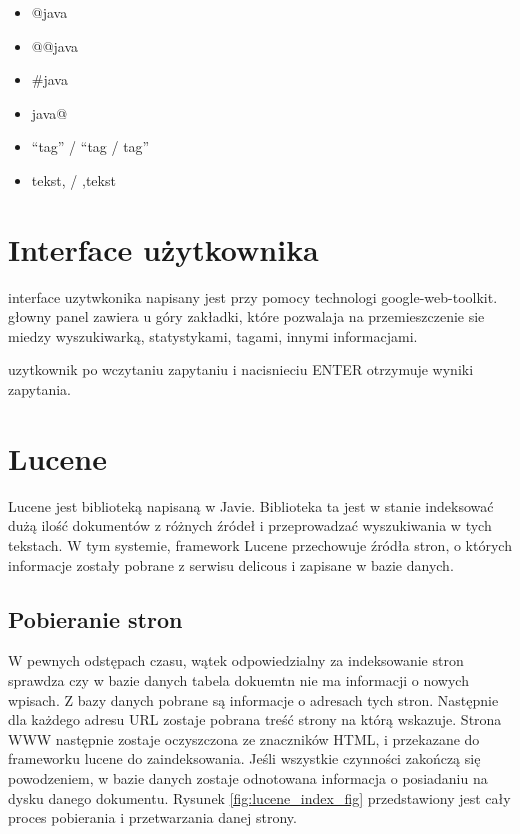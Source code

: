 \begin{itemize} 
    \item @java
    \item  @@java
    \item  \#java
    \item  java@
    \item  “tag” / “tag / tag”
    \item  tekst, / ,tekst
\end{itemize}


\section{Interface użytkownika}
interface uzytwkonika napisany jest przy pomocy technologi google-web-toolkit.
głowny panel zawiera u góry zakładki, które pozwalaja na przemieszczenie sie miedzy wyszukiwarką, statystykami, tagami, innymi informacjami.

uzytkownik po wczytaniu zapytaniu i nacisnieciu ENTER otrzymuje wyniki zapytania.

\section{Lucene}

Lucene jest biblioteką napisaną w Javie. Biblioteka ta jest w stanie indeksować dużą ilość dokumentów z różnych źródeł i przeprowadzać wyszukiwania w tych tekstach. W tym systemie, framework Lucene przechowuje źródła stron, o których informacje zostały pobrane z serwisu delicous i zapisane w bazie danych. 



\subsection{Pobieranie stron}

W pewnych odstępach czasu, wątek odpowiedzialny za indeksowanie stron sprawdza czy w bazie danych tabela dokuemtn nie ma informacji o nowych wpisach. Z bazy danych pobrane są informacje o adresach tych stron. Następnie dla każdego adresu URL zostaje pobrana treść strony na którą wskazuje. Strona WWW następnie zostaje oczyszczona ze znaczników HTML, i przekazane do frameworku lucene do zaindeksowania. Jeśli wszystkie czynności zakończą się powodzeniem, w bazie danych zostaje odnotowana informacja o posiadaniu na dysku danego dokumentu. Rysunek \ref{fig:lucene_index_fig} przedstawiony jest cały proces pobierania i przetwarzania danej strony.

